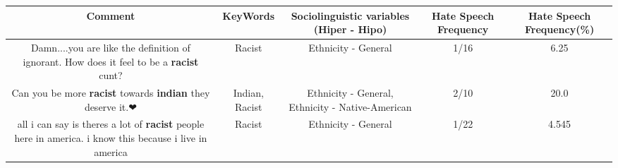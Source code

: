 \documentclass[11pt]{article}
\newlength\mylength
\begin{document}
\begin{center}
\setlength\mylength{\dimexpr\textwidth - 1\arrayrulewidth - 50\tabcolsep}
\begin{longtable}{|C{.65\mylength}|C{.30\mylength}|C{.12\mylength}|C{.12\mylength}|C{.12\mylength}|}
\hline
\textbf{Comment} & \textbf{KeyWords} & \textbf{Sociolinguistic variables (Hiper - Hipo)}  & \textbf{Hate Speech Frequency} & \textbf{Hate Speech Frequency(\%)} \\
\hline{}\small Damn....you are like the definition of ignorant. How does it feel to be a \textbf{racist} cunt?\normalsize   & Racist & Ethnicity - General & 1/16 & 6.25 \\  \hline
  \small Can you be more \textbf{racist} towards \textbf{indian} they deserve it.❤\normalsize   & Indian, Racist & Ethnicity - General, Ethnicity - Native-American & 2/10 & 20.0 \\  \hline
  \small all i can say is theres a lot of \textbf{racist} people here in america. i know this because i live in america\normalsize   & Racist & Ethnicity - General & 1/22 & 4.545 \\  \hline

\end{longtable}
\end{center}
\end{document}
